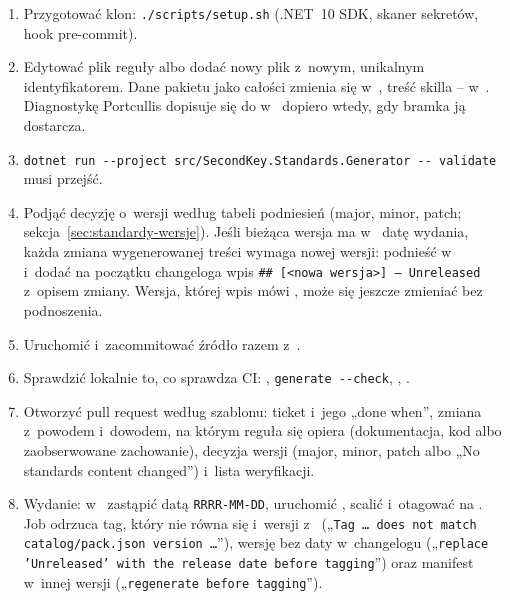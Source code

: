 \begin{enumerate}
  \item Przygotować klon: \texttt{./scripts/setup.sh} (.NET~10 SDK, skaner sekretów, hook
        pre-commit).
  \item Edytować plik reguły albo dodać nowy plik 
        z~nowym, unikalnym identyfikatorem. Dane pakietu jako całości zmienia się
        w~, treść skilla -- w~.
        Diagnostykę Portcullis dopisuje się do 
        w~ dopiero wtedy, gdy bramka ją dostarcza.
  \item \texttt{dotnet run -{}-project src/SecondKey.Standards.Generator -{}- validate} musi
        przejść.
  \item Podjąć decyzję o~wersji według tabeli podniesień (major, minor, patch;
        sekcja~\ref{sec:standardy-wersje}). Jeśli bieżąca wersja ma w~
        datę wydania, każda zmiana wygenerowanej treści wymaga nowej wersji: podnieść
         w~
        i~dodać na początku changeloga wpis \texttt{\#\# [<nowa wersja>] — Unreleased}
        z~opisem zmiany. Wersja, której wpis mówi , może się jeszcze
        zmieniać bez podnoszenia.
  \item Uruchomić  i~zacommitować źródło razem z~.
  \item Sprawdzić lokalnie to, co sprawdza CI: ,
        \texttt{generate -{}-check}, ,
        .
  \item Otworzyć pull request według szablonu: ticket i~jego „done when”, zmiana z~powodem
        i~dowodem, na którym reguła się opiera (dokumentacja, kod albo zaobserwowane
        zachowanie), decyzja wersji (major, minor, patch albo „No standards content
        changed”) i~lista weryfikacji.
  \item Wydanie: w~ zastąpić  datą
        \texttt{RRRR-MM-DD}, uruchomić , scalić i~otagować
         na . Job  odrzuca tag,
        który nie równa się  i~wersji z~ („\texttt{Tag …
        does not match catalog/pack.json version …}”), wersję bez daty w~changelogu
        („\texttt{replace 'Unreleased' with the release date before tagging}”) oraz manifest
        w~innej wersji („\texttt{regenerate before tagging}”).
\end{enumerate}

